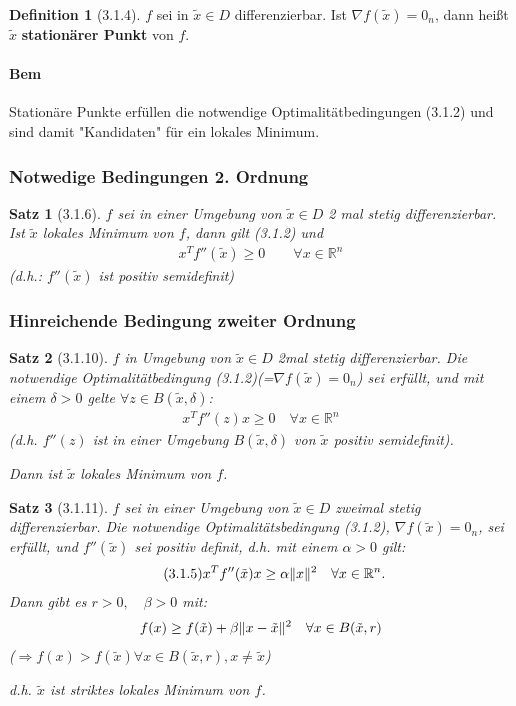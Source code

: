 \documentclass[ngerman,halfparskip]{scrartcl}
\DeclarePairedDelimiter{\norm}{\lVert}{\rVert}
\newtheorem*{satz}{Satz}
\theoremstyle{definition}
\newtheorem*{defin}{Definition}
\newcommand*{\R}{\mathbb{R}}      %
\begin{document}
\begin{defin}[3.1.4]  $f$ sei in $\tilde x \in D $ differenzierbar. Ist $\nabla f(\tilde x)=0_n$, dann heißt $\tilde x$ \textbf{stationärer Punkt} von $f$.
\end{defin}
\paragraph{Bem} Stationäre Punkte erfüllen die notwendige Optimalitätbedingungen (3.1.2) und sind damit "Kandidaten" für ein lokales Minimum.
\subsubsection{Notwedige Bedingungen 2. Ordnung}
\begin{satz}[3.1.6] $f$ sei in einer Umgebung von $\tilde x \in D$ 2 mal stetig differenzierbar. Ist $\tilde x$ lokales Minimum von $f$, dann gilt (3.1.2) und 
\begin{gather}\tag{3.1.3} x^Tf''(\tilde x)\geq 0 \qquad \forall x\in\R^n
\end{gather}
(d.h.: $f''(\tilde x)$ ist positiv semidefinit)
\end{satz}

\subsubsection{Hinreichende Bedingung zweiter Ordnung}
\begin{satz}[3.1.10] $f$ in Umgebung von $\tilde x \in D$ 2mal stetig differenzierbar. Die notwendige Optimalitätbedingung (3.1.2)(=$\nabla f(\tilde x)=0_n$) sei erfüllt, und mit einem $\delta >0$ gelte $\forall z\in B(\tilde x, \delta)$:
\begin{gather}\tag{3.1.4} x^Tf''(z)x \geq 0 \quad \forall x\in\R^n\end{gather} (d.h. $f''(z)$ ist in einer Umgebung $B(\tilde x, \delta)$ von $\tilde x$ positiv semidefinit). 

Dann ist $\tilde x$ lokales Minimum von $f$.
\end{satz}

\begin{satz}[3.1.11] $ f $ sei in einer Umgebung von $ \tilde x \in D $ zweimal stetig differenzierbar. Die notwendige Optimalitätsbedingung (3.1.2), $ \nabla f(\tilde x)=0_n $, sei erfüllt, und $ f''(\tilde{x}) $ sei positiv definit, d.h. mit einem $ \alpha > 0 $ gilt:
\begin{gather}\tag{3.1.5} x^Tf''(\tilde x )x \geq \alpha \norm{x}^2\quad \forall x \in \R^n.\end{gather}
Dann gibt es $ r>0, \quad \beta >0 $ mit: 
\begin{gather*} f(x)\geq f(\tilde x)+\beta \norm{x-\tilde x}^2 \quad \forall x\in B(\tilde x, r)\end{gather*}
($ \Rightarrow f(x)> f(\tilde x) \forall x \in  B(\tilde x, r), x\neq\tilde x$)

d.h. $ \tilde x $ ist striktes lokales Minimum von $ f $.
\end{satz}
\end{document}
